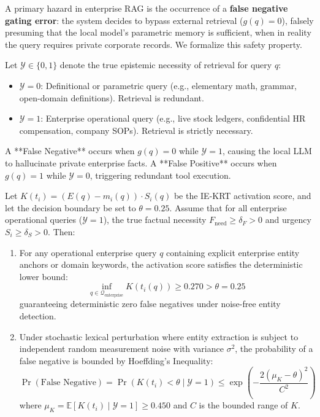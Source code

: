 A primary hazard in enterprise RAG is the occurrence of a \textbf{false negative gating error}: the system decides to bypass external retrieval ($g(q) = 0$), falsely presuming that the local model's parametric memory is sufficient, when in reality the query requires private corporate records. We formalize this safety property.

\begin{definition}
Let $\mathcal{Y} \in \{0, 1\}$ denote the true epistemic necessity of retrieval for query $q$:
\begin{itemize}
    \item $\mathcal{Y} = 0$: Definitional or parametric query (e.g., elementary math, grammar, open-domain definitions). Retrieval is redundant.
    \item $\mathcal{Y} = 1$: Enterprise operational query (e.g., live stock ledgers, confidential HR compensation, company SOPs). Retrieval is strictly necessary.
\end{itemize}
A **False Negative** occurs when $g(q) = 0$ while $\mathcal{Y} = 1$, causing the local LLM to hallucinate private enterprise facts.
A **False Positive** occurs when $g(q) = 1$ while $\mathcal{Y} = 0$, triggering redundant tool execution.
\end{definition}

\begin{theorem}
Let $K(t_i) = (E(q) - m_i(q)) \cdot S_i(q)$ be the IE-KRT activation score, and let the decision boundary be set to $\theta = 0.25$. Assume that for all enterprise operational queries ($\mathcal{Y} = 1$), the true factual necessity $F_{\text{need}} \ge \delta_F > 0$ and urgency $S_i \ge \delta_S > 0$. Then:
\begin{enumerate}
    \item For any operational enterprise query $q$ containing explicit enterprise entity anchors or domain keywords, the activation score satisfies the deterministic lower bound:
    \begin{equation}
        \inf_{q \in \mathcal{Q}_{\text{enterprise}}} K(t_i(q)) \ge 0.270 > \theta = 0.25
    \end{equation}
    guaranteeing deterministic zero false negatives under noise-free entity detection.
    \item Under stochastic lexical perturbation where entity extraction is subject to independent random measurement noise with variance $\sigma^2$, the probability of a false negative is bounded by Hoeffding's Inequality:
    \begin{equation}
        \Pr(\text{False Negative}) = \Pr(K(t_i) < \theta \mid \mathcal{Y} = 1) \le \exp\left( - \frac{2 (\mu_K - \theta)^2}{C^2} \right)
    \end{equation}
    where $\mu_K = \mathbb{E}[K(t_i) \mid \mathcal{Y} = 1] \ge 0.450$ and $C$ is the bounded range of $K$.
\end{enumerate}
\end{theorem}

